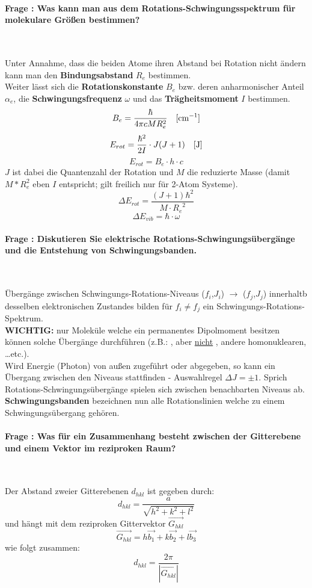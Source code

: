 \documentclass[a4paper, 11pt, ngerman, parskip=half-]{scrartcl}
\newcounter{question}
\newcommand{\question}[1]{\stepcounter{question}\paragraph{Frage \thequestion: #1}~}
\begin{document}
\question{Was kann man aus dem Rotations-Schwingungsspektrum für molekulare Größen bestimmen?}
\label{q:2}

Unter Annahme, dass die beiden Atome ihren Abstand bei Rotation nicht ändern kann man den \textbf{Bindungsabstand} $R_e$ bestimmen. \\
Weiter lässt sich die \textbf{Rotationskonstante} $B_e$ bzw. deren anharmonischer Anteil $\alpha_e$, die \textbf{Schwingungsfrequenz} $\omega$ und das \textbf{Trägheitsmoment} $I$ bestimmen. \\

\[B_e = \frac{\hbar}{4 \pi c M R_e^2}\text{\quad [cm$^{-1}$]}\]
\[E_{rot} = \frac{\hbar^2}{2 I} \cdot J(J+1)\text{\quad [J]}\]
\[E_{rot} = B_e \cdot h\cdot c\]
$J$ ist dabei die Quantenzahl der Rotation und $M$ die reduzierte Masse (damit $M * R_e^2$ eben $I$ entspricht; gilt freilich nur für 2-Atom Systeme). \\

\[\Delta E_{rot} = \frac{(J+1)\hbar^2}{M\cdot {R_e}^2}\]
\[\Delta E_{vib} = \hbar \cdot \omega\]

\question{Diskutieren Sie elektrische Rotations-Schwingungsübergänge und die Entstehung von Schwingungsbanden.}
\label{q:3}

Übergänge zwischen Schwingungs-Rotations-Niveaus ($f_i$,$J_i$) $\rightarrow$ ($f_j$,$J_j$) innerhaltb desselben elektronischen Zustandes bilden für $f_i \neq f_j$ ein Schwingungs-Rotations-Spektrum. \\

\textbf{WICHTIG:} nur Moleküle welche ein permanentes Dipolmoment besitzen können solche Übergänge durchführen (z.B.: ,  aber \underline{nicht} , andere homonuklearen, \dots etc.). \\

Wird Energie (Photon) von außen zugeführt oder abgegeben, so kann ein Übergang zwischen den Niveaus stattfinden - Auswahlregel $\Delta J = \pm 1$. Sprich Rotations-Schwingungsübergänge spielen sich zwischen benachbarten Niveaus ab.\\

\textbf{Schwingungsbanden} bezeichnen nun alle Rotationslinien welche zu einem Schwingungsübergang gehören. \\


\question{Was für ein Zusammenhang besteht zwischen der Gitterebene und einem Vektor im reziproken Raum?}
\label{q:4}

Der Abstand zweier Gitterebenen $d_{hkl}$ ist gegeben durch:
\[d_{hkl} = \frac{a}{\sqrt{h^2 + k^2 + l^2}}\]
und hängt mit dem reziproken Gittervektor $\vec{G_{hkl}}$ 
\[\vec{G_{hkl}} = h\vec{b_1} + k\vec{b_2} + l\vec{b_3}\]
wie folgt zusammen:
\[d_{hkl} = \frac{2\pi}{|\vec{G_{hkl}}|}\]
\end{document}
